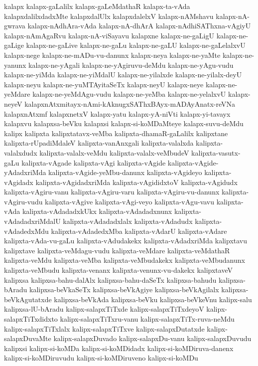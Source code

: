 {kalapx
kalapx-gaLalilx
kalapx-gaLeMdathaR
kalapx-ta-vAda
kalapxdalilxdadxMte
kalapxdalUlx
kalapxdalelxV
kalapx-nAMshavu
kalapx-nA-gwrava
kalapx-nAdhAra-vAda
kalapx-nA-dhArA
kalapx-nAdhiSAThxna-vAgiyU
kalapx-nAmAgaRvu
kalapx-nA-viSayavu
kalapxne
kalapx-ne-gaLigU
kalapx-ne-gaLige
kalapx-ne-gaLive
kalapx-ne-gaLu
kalapx-ne-gaLU
kalapx-ne-gaLelalxvU
kalapx-nege
kalapx-ne-mADu-vu-danunx
kalapx-neya
kalapx-ne-yaMte
kalapx-ne-yanunx
kalapx-ne-yAgali
kalapx-ne-yAgiruvu-deMdu
kalapx-ne-yAgu-vudu
kalapx-ne-yiMda
kalapx-ne-yiMdalU
kalapx-ne-yilalxde
kalapx-ne-yilalx-deyU
kalapx-neyu
kalapx-ne-yuMTAyitaSeTx
kalapx-neyU
kalapx-neye
kalapx-ne-yeMdare
kalapx-ne-yeMdAgu-vudu
kalapx-ne-yeMba
kalapx-ne-yelalxvU
kalapx-neyeV
kalapxnAtxmitayx-nAmi-kAknugxSAThxBAyx-mADAyAnatx-reVNa
kalapxnAtxmf
kalapxnetxV
kalapx-yatu
kalapx-yA-niVti
kalapx-yi-tavayx
kalapxvu
kalapxsa-beVku
kalapxsi
kalapx-si-koMDaMteye
kalapx-suvu-deMdu
kalipx
kalipxta
kalipxtatavx-veMba
kalipxta-dhamaR-gaLalilx
kalipxtane
kalipxta-rUpadiMdaleV
kalipxta-vanAnxgali
kalipxta-valalxda
kalipxta-valalxdudx
kalipxta-valalx-veMdu
kalipxta-valalx-veMbudeV
kalipxta-vasutx-gaLu
kalipxta-vAgade
kalipxta-vAgi
kalipxta-vAgide
kalipxta-vAgide-yAdadxriMda
kalipxta-vAgide-yeMbu-danunx
kalipxta-vAgideyo
kalipxta-vAgidadx
kalipxta-vAgidadxriMda
kalipxta-vAgididxtoV
kalipxta-vAgidudx
kalipxta-vAgiru-vanu
kalipxta-vAgiru-varu
kalipxta-vAgiru-vu-danunx
kalipxta-vAgiru-vudu
kalipxta-vAgive
kalipxta-vAgi-veyo
kalipxta-vAgu-vavu
kalipxta-vAda
kalipxta-vAdadadxkUkx
kalipxta-vAdadadxnunx
kalipxta-vAdadadxriMdalU
kalipxta-vAdadadxlalx
kalipxta-vAdadudx
kalipxta-vAdadedxMdu
kalipxta-vAdadedxMba
kalipxta-vAdarU
kalipxta-vAdare
kalipxta-vAda-vu-gaLu
kalipxta-vAdudakekx
kalipxta-vAdadxriMda
kalipxtavu
kalipxtave
kalipxta-veMdagu-vudu
kalipxta-veMdare
kalipxta-veMdathaR
kalipxta-veMdu
kalipxta-veMba
kalipxta-veMbudakekx
kalipxta-veMbudanunx
kalipxta-veMbudu
kalipxta-venanx
kalipxta-venunx-vu-dakekx
kalipxtaveV
kalipxsa
kalipxsa-bahu-dalAlx
kalipxsa-bahu-daSeTx
kalipxsa-bahudu
kalipxsa-bAradu
kalipxsa-beVkaSeTx
kalipxsa-beVkAgiye
kalipxsa-beVkAgilalx
kalipxsa-beVkAgutatxde
kalipxsa-beVkAda
kalipxsa-beVku
kalipxsa-beVkeVnu
kalipx-salu
kalipxsa-lU-bAradu
kalipx-salapxTiTxde
kalipx-salapxTiTxdeyoV
kalipx-salapxTiTxdidxto
kalipx-salapxTiTxru-vanu
kalipx-salapxTiTx-ruva-neMdu
kalipx-salapxTiTxlalx
kalipx-salapxTiTxve
kalipx-salapxDutatxde
kalipx-salapxDuvaMte
kalipx-salapxDuvado
kalipx-salapxDu-vanu
kalipx-salapxDuvudu
kalipxsi
kalipx-si-koMDa
kalipx-si-koMDidadx
kalipx-si-koMDiruva-danenx
kalipx-si-koMDiruvudu
kalipx-si-koMDiruveno
kalipx-si-koMDu
}
